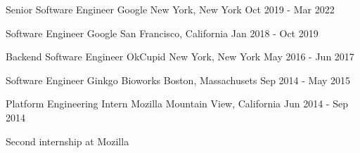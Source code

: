 
\begin{cventries}
  \cventry
    {Senior Software Engineer}
    {Google}
    {New York, New York}
    {Oct 2019 - Mar 2022}
    {
      \begin{cvitems}
      \end{cvitems}
    }

  \cventry
    {Software Engineer}
    {Google}
    {San Francisco, California}
    {Jan 2018 - Oct 2019}
    {
      \begin{cvitems}
      \end{cvitems}
    }

  \cventry
    {Backend Software Engineer}
    {OkCupid}
    {New York, New York}
    {May 2016 - Jun 2017}
    {
      \begin{cvitems}
      \end{cvitems}
    }

  \cventry
    {Software Engineer}
    {Ginkgo Bioworks}
    {Boston, Massachusets}
    {Sep 2014 - May 2015}
    {
      \begin{cvitems}
      \end{cvitems}
    }

  \cventry
    {Platform Engineering Intern}
    {Mozilla}
    {Mountain View, California}
    {Jun 2014 - Sep 2014}
    {
      \begin{cvitems}
        \item {Second internship at Mozilla}
      \end{cvitems}
    }
\end{cventries}
